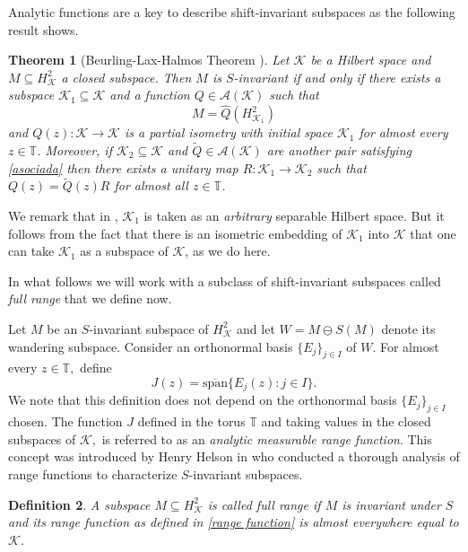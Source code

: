 \documentclass[a4paper,12pt]{amsart}
\def\cA{{\mathcal{A}}}
\def\KK{{\mathcal{K}}}
\def\T{{\mathbb{T}}}
\def\osp{{\overline{\textrm{span}}}}
\newtheorem{theorem}{Theorem}[section]
\newtheorem{definition}[theorem]{Definition}
\theoremstyle{definition}
\begin{document}
Analytic functions are  a key to describe shift-invariant subspaces as the following result shows.

\begin{theorem}[{Beurling-Lax-Halmos Theorem \cite[$\S$VI]{H}}]\label{thm:beu-lax-hal}
Let $\KK$ be a Hilbert space and $M\subseteq H^2_\KK$ a closed subspace. Then $M$ is $S$-invariant if and only if there exists a subspace $\KK_1\subseteq\KK$ and a function $Q\in\cA(\KK)$ such that
\begin{equation}\label{asociada}
M=\widehat{Q}(H^2_{\KK_1})
\end{equation}
and $Q(z):\KK\to\KK$ is a partial isometry with initial space $\KK_1$ for almost every $z\in\T$.
Moreover, if $\KK_2\subseteq\KK$ and $\widetilde{Q}\in\cA(\KK)$ are another pair satisfying \eqref{asociada} then there exists a unitary map $R:\KK_1\to\KK_2$ such that $Q(z)=\widetilde{Q}(z)R$ for almost all $z\in\T$.
\end{theorem}

We remark that in \cite{H}, $\KK_1$ is taken as an {\em arbitrary} separable Hilbert space. But it follows from the fact that there is an isometric embedding of $\KK_1$ into $\KK$ that one can take $\KK_1$ as a subspace of $\KK$, as we do here.

In what follows we will work with a subclass of shift-invariant subspaces called {\em full range} that we define now.


Let $M$ be an $S$-invariant subspace of $H^2_{\KK}$ and let $W=M\ominus S(M)$ denote its wandering subspace. Consider an orthonormal basis $\{E_j\}_{j\in I}$ of $W$. For almost every $z\in\T,$ define
\begin{equation}\label{range function}
J(z)=\osp\{E_j(z): j\in I\}.
\end{equation}
We note that this definition does not depend on the orthonormal basis $\{E_j\}_{j\in I}$ chosen. The function $J$ defined in the torus $\T$ and taking values in the closed subspaces of $\KK,$ is referred to as an {\em analytic measurable range function}. This concept was introduced by Henry Helson in \cite{H} who conducted a thorough analysis of range functions to characterize $S$-invariant subspaces.



\begin{definition}\label{def:full-range}
A subspace $M\subseteq H^2_\KK$ is called  full range if $M$ is invariant under $S$ and 
its range function as defined in \eqref{range function} is almost everywhere equal to $\KK$.
\end{definition}
\end{document}
